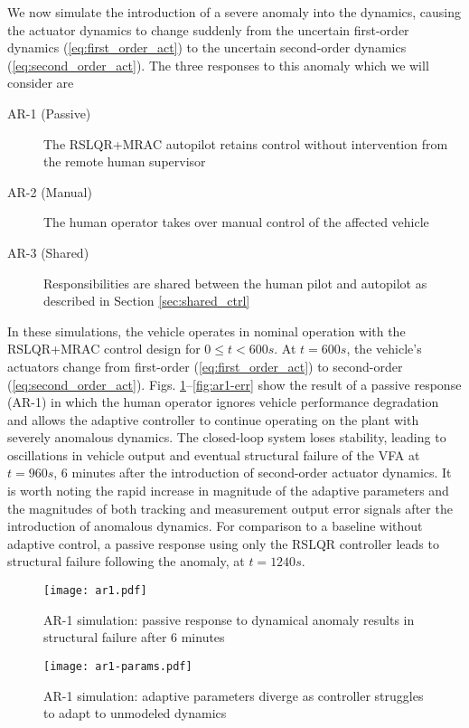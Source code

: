 We now simulate the introduction of a severe anomaly into the dynamics, causing the actuator dynamics to change suddenly from the uncertain first-order dynamics (\ref{eq:first_order_act}) to the uncertain second-order dynamics (\ref{eq:second_order_act}). The three responses to this anomaly which we will consider are
\begin{description}
	\item[AR-1 (Passive)] The RSLQR+MRAC autopilot retains control without intervention from the remote human supervisor
	\item[AR-2 (Manual)] The human operator takes over manual control of the affected vehicle
	\item[AR-3 (Shared)] Responsibilities are shared between the human pilot and autopilot as described in Section \ref{sec:shared_ctrl}
\end{description}

In these simulations, the vehicle operates in nominal operation with the RSLQR+MRAC control design for $0 \leq t < 600 s$. At $t = 600 s$, the vehicle's actuators change from first-order (\ref{eq:first_order_act}) to second-order (\ref{eq:second_order_act}). Figs. \ref{fig:ar1}--\ref{fig:ar1-err} show the result of a passive response (AR-1) in which the human operator ignores vehicle performance degradation and allows the adaptive controller to continue operating on the plant with severely anomalous dynamics. The closed-loop system loses stability, leading to oscillations in vehicle output and eventual structural failure of the VFA at $t = 960s$, 6 minutes after the introduction of second-order actuator dynamics. It is worth noting the rapid increase in magnitude of the adaptive parameters and the magnitudes of both tracking and measurement output error signals after the introduction of anomalous dynamics. For comparison to a baseline without adaptive control, a passive response using only the RSLQR controller leads to structural failure following the anomaly, at $t = 1240s$.

\begin{figure}[htbp]
	\centering
	\texttt{[image: ar1.pdf]}
	\caption{AR-1 simulation: passive response to dynamical anomaly results in structural failure after 6 minutes}
	\label{fig:ar1}
\end{figure}

\begin{figure}[htbp]
	\centering
	\texttt{[image: ar1-params.pdf]}
	\caption{AR-1 simulation: adaptive parameters diverge as controller struggles to adapt to unmodeled dynamics}
	\label{fig:ar1-params}
\end{figure}

